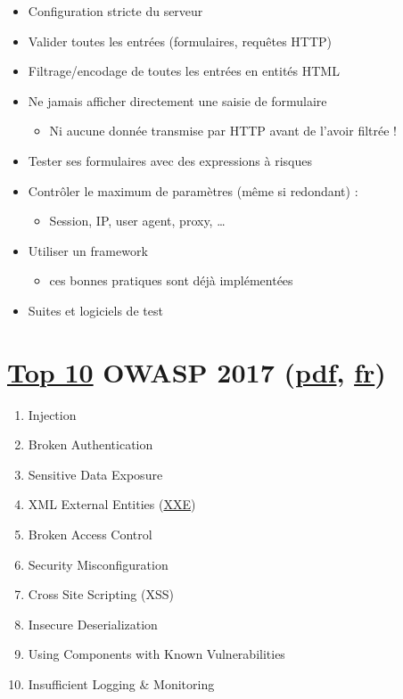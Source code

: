 \begin{itemize}
\tightlist
\item
  Configuration stricte du serveur
\item
  Valider toutes les entrées (formulaires, requêtes HTTP)
\item
  Filtrage/encodage de toutes les entrées en entités HTML
\item
  Ne jamais afficher directement une saisie de formulaire

  \begin{itemize}
  \tightlist
  \item
    Ni aucune donnée transmise par HTTP avant de l'avoir filtrée !
  \end{itemize}
\item
  Tester ses formulaires avec des expressions à risques
\item
  Contrôler le maximum de paramètres (même si redondant) :

  \begin{itemize}
  \tightlist
  \item
    Session, IP, user agent, proxy, \ldots{}
  \end{itemize}
\item
  Utiliser un framework

  \begin{itemize}
  \tightlist
  \item
    ces bonnes pratiques sont déjà implémentées
  \end{itemize}
\item
  Suites et logiciels de test
\end{itemize}

\hypertarget{top-109-owasp-2017-pdf26-fr27}{%
\section{\texorpdfstring{\href{https://www.owasp.org/index.php/Category:OWASP_Top_Ten_Project}{Top
10} OWASP 2017
(\href{https://www.owasp.org/images/7/72/OWASP_Top_10-2017_\%28en\%29.pdf.pdf}{pdf},
\href{https://github.com/OWASP/Top10/tree/master/2017/fr}{fr})}{Top 10 OWASP 2017 (pdf, fr)}}\label{top-109-owasp-2017-pdf26-fr27}}

\begin{enumerate}
\def\labelenumi{\arabic{enumi}.}
\tightlist
\item
  Injection
\item
  Broken Authentication
\item
  Sensitive Data Exposure
\item
  XML External Entities
  (\href{https://www.acunetix.com/blog/articles/xml-external-entity-xxe-vulnerabilities/}{XXE})
\item
  Broken Access Control
\item
  Security Misconfiguration
\item
  Cross Site Scripting (XSS)
\item
  Insecure Deserialization
\item
  Using Components with Known Vulnerabilities
\item
  Insufficient Logging \& Monitoring
\end{enumerate}

